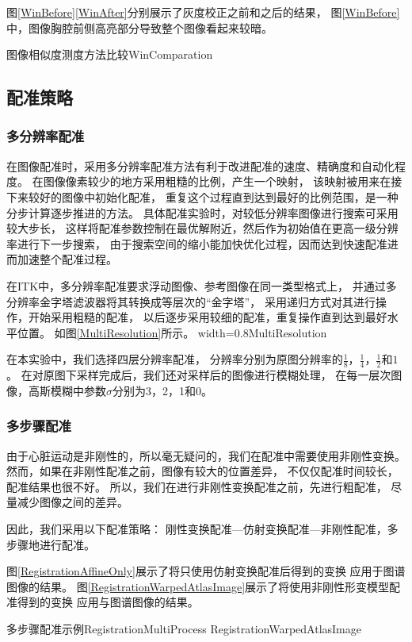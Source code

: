 图\ref{WinBefore}\ref{WinAfter}分别展示了灰度校正之前和之后的结果，
图\ref{WinBefore}中，图像胸腔前侧高亮部分导致整个图像看起来较暗。
\begin{pics}[htbp]{图像相似度测度方法比较}{WinComparation}
\end{pics}

\subsection{配准策略}
\subsubsection{多分辨率配准}
在图像配准时，采用多分辨率配准方法有利于改进配准的速度、精确度和自动化程度。
在图像像素较少的地方采用粗糙的比例，产生一个映射，
该映射被用来在接下来较好的图像中初始化配准，
重复这个过程直到达到最好的比例范围，是一种分步计算逐步推进的方法。
具体配准实验时，对较低分辨率图像进行搜索可采用较大步长，
这样将配准参数控制在最优解附近，然后作为初始值在更高一级分辨率进行下一步搜索，
由于搜索空间的缩小能加快优化过程，因而达到快速配准进而加速整个配准过程。

在ITK中，多分辨率配准要求浮动图像、参考图像在同一类型格式上，
并通过多分辨率金字塔滤波器将其转换成等层次的``金字塔''，
采用递归方式对其进行操作，开始采用粗糙的配准，
以后逐步采用较细的配准，重复操作直到达到最好水平位置。
如图\ref{MultiResolution}所示。
%
{width=0.8\textwidth}{MultiResolution}

在本实验中，我们选择四层分辨率配准，
分辨率分别为原图分辨率的$\frac{1}{8}$，$\frac{1}{4}$，$\frac{1}{2}$和$1$。
在对原图下采样完成后，我们还对采样后的图像进行模糊处理，
在每一层次图像，高斯模糊中参数$\sigma$分别为3，2，1和0。


\subsubsection{多步骤配准}
由于心脏运动是非刚性的，所以毫无疑问的，我们在配准中需要使用非刚性变换。
然而，如果在非刚性配准之前，图像有较大的位置差异，
不仅仅配准时间较长，配准结果也很不好。
所以，我们在进行非刚性变换配准之前，先进行粗配准，
尽量减少图像之间的差异。

因此，我们采用以下配准策略：
刚性变换配准---仿射变换配准---非刚性配准，多步骤地进行配准。

图\ref{RegistrationAffineOnly}展示了将只使用仿射变换配准后得到的变换
应用于图谱图像的结果。
图\ref{RegistrationWarpedAtlasImage}展示了将使用非刚性形变模型配准得到的变换
应用与图谱图像的结果。
\begin{pics}[htbp]{多步骤配准示例}{RegistrationMultiProcess}
    {RegistrationWarpedAtlasImage}
\end{pics}



